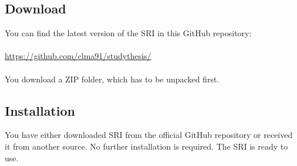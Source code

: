 
\thispagestyle{plain}
\renewcommand\section{\stdsection}
\setcounter{section}{3}
\subsection{Download}
You can find the latest version of the SRI in this GitHub repository: \\\\
\url{https://github.com/clma91/studythesis/}
\\\\
You download a ZIP folder, which has to be unpacked first.
\subsection{Installation}
You have either downloaded SRI from the official GitHub repository or received it from another source. No further installation is required. The SRI is ready to use.